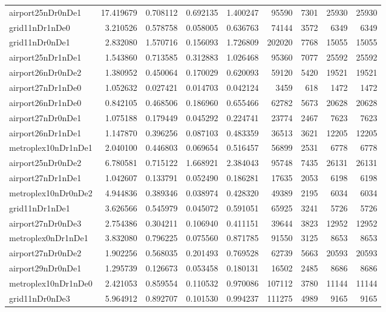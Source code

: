 \begin{longtable}{|l|r|r|r|r|r|r|r|r|}
airport25nDr0nDe1 & 17.419679 & 0.708112 & 0.692135 & 1.400247 & 95590 & 7301 & 25930 & 25930 \\
grid11nDr1nDe0 & 3.210526 & 0.578758 & 0.058005 & 0.636763 & 74144 & 3572 & 6349 & 6349 \\
grid11nDr0nDe1 & 2.832080 & 1.570716 & 0.156093 & 1.726809 & 202020 & 7768 & 15055 & 15055 \\
airport25nDr1nDe1 & 1.543860 & 0.713585 & 0.312883 & 1.026468 & 95360 & 7077 & 25592 & 25592 \\
airport26nDr0nDe2 & 1.380952 & 0.450064 & 0.170029 & 0.620093 & 59120 & 5420 & 19521 & 19521 \\
airport27nDr1nDe0 & 1.052632 & 0.027421 & 0.014703 & 0.042124 & 3459 & 618 & 1472 & 1472 \\
airport26nDr1nDe0 & 0.842105 & 0.468506 & 0.186960 & 0.655466 & 62782 & 5673 & 20628 & 20628 \\
airport27nDr0nDe1 & 1.075188 & 0.179449 & 0.045292 & 0.224741 & 23774 & 2467 & 7623 & 7623 \\
airport26nDr1nDe1 & 1.147870 & 0.396256 & 0.087103 & 0.483359 & 36513 & 3621 & 12205 & 12205 \\
metroplex10nDr1nDe1 & 2.040100 & 0.446803 & 0.069654 & 0.516457 & 56899 & 2531 & 6778 & 6778 \\
airport25nDr0nDe2 & 6.780581 & 0.715122 & 1.668921 & 2.384043 & 95748 & 7435 & 26131 & 26131 \\
airport27nDr1nDe1 & 1.042607 & 0.133791 & 0.052490 & 0.186281 & 17635 & 2053 & 6198 & 6198 \\
metroplex10nDr0nDe2 & 4.944836 & 0.389346 & 0.038974 & 0.428320 & 49389 & 2195 & 6034 & 6034 \\
grid11nDr1nDe1 & 3.626566 & 0.545979 & 0.045072 & 0.591051 & 65925 & 3241 & 5726 & 5726 \\
airport27nDr0nDe3 & 2.754386 & 0.304211 & 0.106940 & 0.411151 & 39644 & 3823 & 12952 & 12952 \\
metroplex0nDr1nDe1 & 3.832080 & 0.796225 & 0.075560 & 0.871785 & 91550 & 3125 & 8653 & 8653 \\
airport27nDr0nDe2 & 1.902256 & 0.568035 & 0.201493 & 0.769528 & 62739 & 5663 & 20593 & 20593 \\
airport29nDr0nDe1 & 1.295739 & 0.126673 & 0.053458 & 0.180131 & 16502 & 2485 & 8686 & 8686 \\
metroplex10nDr1nDe0 & 2.421053 & 0.859554 & 0.110532 & 0.970086 & 107112 & 3780 & 11144 & 11144 \\
grid11nDr0nDe3 & 5.964912 & 0.892707 & 0.101530 & 0.994237 & 111275 & 4989 & 9165 & 9165 \\

\end{longtable}
